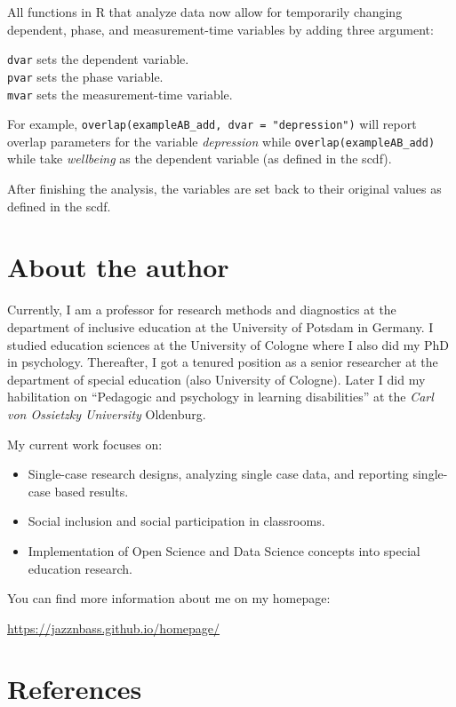 \documentclass[
]{book}
\providecommand{\tightlist}{%
  \setlength{\itemsep}{0pt}\setlength{\parskip}{0pt}}
\begin{document}
All functions in R that analyze data now allow for temporarily changing dependent, phase, and measurement-time variables by adding three argument:

\texttt{dvar} sets the dependent variable.\\
\texttt{pvar} sets the phase variable.\\
\texttt{mvar} sets the measurement-time variable.

For example, \texttt{overlap(exampleAB\_add,\ dvar\ =\ "depression")} will report overlap parameters for the variable \emph{depression} while \texttt{overlap(exampleAB\_add)} while take \emph{wellbeing} as the dependent variable (as defined in the scdf).

After finishing the analysis, the variables are set back to their original values as defined in the scdf.

\hypertarget{about-the-author}{%
\chapter*{About the author}\label{about-the-author}}

Currently, I am a professor for research methods and diagnostics at the department of inclusive education at the University of Potsdam in Germany. I studied education sciences at the University of Cologne where I also did my PhD in psychology. Thereafter, I got a tenured position as a senior researcher at the department of special education (also University of Cologne). Later I did my habilitation on ``Pedagogic and psychology in learning disabilities'' at the \emph{Carl von Ossietzky University} Oldenburg.

My current work focuses on:

\begin{itemize}
\tightlist
\item
  Single-case research designs, analyzing single case data, and reporting single-case based results.
\item
  Social inclusion and social participation in classrooms.
\item
  Implementation of Open Science and Data Science concepts into special education research.
\end{itemize}

You can find more information about me on my homepage:

\url{https://jazznbass.github.io/homepage/}

\hypertarget{references}{%
\chapter*{References}\label{references}}

  
\end{document}
